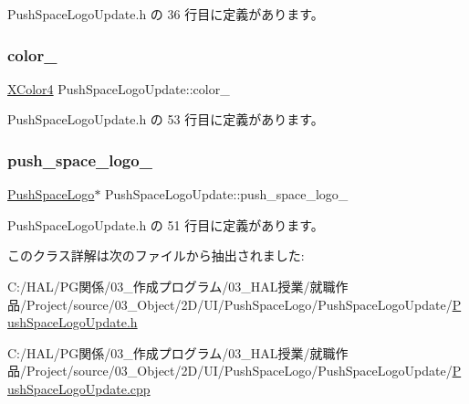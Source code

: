  Push\+Space\+Logo\+Update.\+h の 36 行目に定義があります。

\mbox{\label{class_push_space_logo_update_a5a8bff1192b24c515b8b4dc753e39cd1}} 
\subsubsection{\texorpdfstring{color\+\_\+}{color\_}}
{\footnotesize\ttfamily \mbox{\hyperlink{_vector3_d_8h_a680c30c4a07d86fe763c7e01169cd6cc}{X\+Color4}} Push\+Space\+Logo\+Update\+::color\+\_\+\hspace{0.3cm}{\ttfamily [private]}}



 Push\+Space\+Logo\+Update.\+h の 53 行目に定義があります。

\mbox{\label{class_push_space_logo_update_ad8880dbcf9117d05da13e0d6630b5952}} 
\subsubsection{\texorpdfstring{push\+\_\+space\+\_\+logo\+\_\+}{push\_space\_logo\_}}
{\footnotesize\ttfamily \mbox{\hyperlink{class_push_space_logo}{Push\+Space\+Logo}}$\ast$ Push\+Space\+Logo\+Update\+::push\+\_\+space\+\_\+logo\+\_\+\hspace{0.3cm}{\ttfamily [private]}}



 Push\+Space\+Logo\+Update.\+h の 51 行目に定義があります。



このクラス詳解は次のファイルから抽出されました\+:\begin{DoxyCompactItemize}
\item 
C\+:/\+H\+A\+L/\+P\+G関係/03\+\_\+作成プログラム/03\+\_\+\+H\+A\+L授業/就職作品/\+Project/source/03\+\_\+\+Object/2\+D/\+U\+I/\+Push\+Space\+Logo/\+Push\+Space\+Logo\+Update/\mbox{\hyperlink{_push_space_logo_update_8h}{Push\+Space\+Logo\+Update.\+h}}\item 
C\+:/\+H\+A\+L/\+P\+G関係/03\+\_\+作成プログラム/03\+\_\+\+H\+A\+L授業/就職作品/\+Project/source/03\+\_\+\+Object/2\+D/\+U\+I/\+Push\+Space\+Logo/\+Push\+Space\+Logo\+Update/\mbox{\hyperlink{_push_space_logo_update_8cpp}{Push\+Space\+Logo\+Update.\+cpp}}\end{DoxyCompactItemize}
